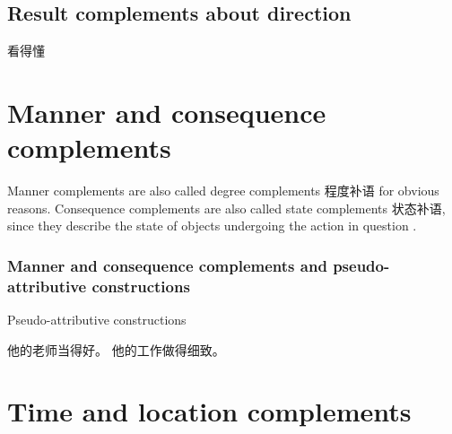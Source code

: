 \documentclass[../main.tex]{subfiles}
\begin{document}
\subsection{Result complements about direction}\label{sec:direction-potential-complement}

看得懂

\section{Manner and consequence complements}\label{sec:manner-consequence-complement}

Manner complements are also called degree complements 程度补语 for obvious reasons.
Consequence complements are also called state complements 状态补语, since they describe the state of 
objects undergoing the action in question \citep[]{xianhan2004}.

\subsubsection{Manner and consequence complements and pseudo-attributive constructions}

\begin{exe}
    \ex Pseudo-attributive constructions 
    \begin{xlist}
        \ex 他的老师当得好。
        \ex 他的工作做得细致。
    \end{xlist}
\end{exe}
\citep{huang2008}

\section{Time and location complements}\label{sec:location-complement}
\end{document}
